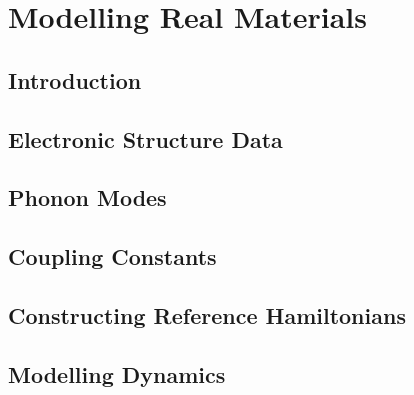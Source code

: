 
\chapter{Modelling Real Materials} %

\label{Chapter5} %


\section{Introduction}

\section{Electronic Structure Data}

\section{Phonon Modes}

\section{Coupling Constants}

\section{Constructing Reference Hamiltonians}

\section{Modelling Dynamics}

